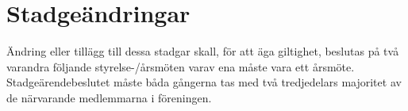 \section{Stadgeändringar}
Ändring eller tillägg till dessa stadgar skall, för att äga giltighet, beslutas på två varandra följande styrelse-/årsmöten varav ena måste vara ett årsmöte. Stadgeärendebeslutet måste båda gångerna tas med två tredjedelars majoritet av de närvarande medlemmarna i föreningen.
